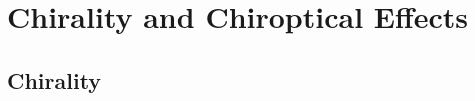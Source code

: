 \section{Chirality and Chiroptical Effects}
\label{sec:background:ChiropticalEffects}

\subsection{Chirality}
\label{sec:chirality}
